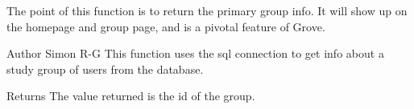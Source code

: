 The point of this function is to return the primary group info. It will show up on the homepage and group page, and is a pivotal feature of Grove. \begin{DoxyAuthor}{Author}
Simon R-\/\-G This function uses the sql connection to get info about a study group of users from the database.
\end{DoxyAuthor}
\begin{DoxyReturn}{Returns}
The value returned is the id of the group. 
\end{DoxyReturn}
